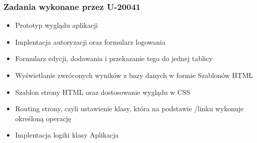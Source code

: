     \subsubsection{Zadania wykonane przez U-20041}
    \begin{itemize}

        \item Prototyp wyglądu aplikacji
        \item Implentacja autoryzacji oraz formularz logowania
        \item Formularz edycji, dodawania i przekazanie tego do jednej tablicy
        \item Wyświetlanie zwróconych wyników z bazy danych w formie Szablonów HTML
        \item Szablon strony HTML oraz dostosowanie wyglądu w CSS
        \item Routing strony, czyli ustawienie klasy, która na podstawie /linku wykonuje określoną operację
        \item Implentacja logiki klasy Aplikacja
    \end{itemize}
